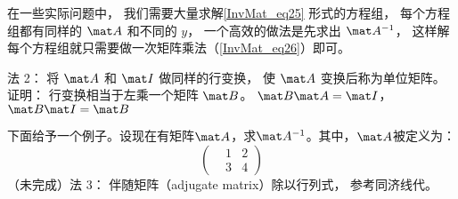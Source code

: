 在一些实际问题中， 我们需要大量求解\autoref{InvMat_eq25} 形式的方程组， 每个方程组都有同样的 $\mat A$ 和不同的 $y$， 一个高效的做法是先求出 $\mat A^{-1}$， 这样解每个方程组就只需要做一次矩阵乘法（\autoref{InvMat_eq26}）即可。

法 2： 将 $\mat A$ 和 $\mat I$ 做同样的行变换， 使 $\mat A$ 变换后称为单位矩阵。 
证明： 行变换相当于左乘一个矩阵 $\mat B$。 $\mat B\mat A = \mat I$， $\mat B \mat I = \mat B$

下面给予一个例子。设现在有矩阵$\mat A$，求$\mat A^{-1}$。其中，$\mat A$被定义为：
$$
\left(
    \begin{matrix}
    &1&2\\
    &3&4
    \end{matrix}
\right)
$$
（未完成）法 3： 伴随矩阵（adjugate matrix）除以行列式， 参考同济线代。%
